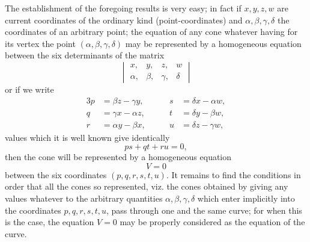 \documentclass[11pt,a4paper]{book}
\begin{document}
The establishment of the foregoing results is very easy; in fact if $x, y, z, w$ are current coordinates of the ordinary kind (point-coordinates) and $\alpha, \beta, \gamma, \delta$ the coordinates of an arbitrary point; the equation of any cone whatever having for its vertex the point $(\alpha, \beta, \gamma, \delta)$ may be represented by a homogeneous equation between the six determinants of the matrix
\[
\begin{vmatrix}
x, & y, & z, & w \\
\alpha, & \beta, & \gamma, & \delta
\end{vmatrix}
\]
or if we write
\begin{alignat*}{3}
p &= \beta z - \gamma y, &\qquad s &= \delta x - \alpha w,\\
q &= \gamma x - \alpha z, &\qquad t &= \delta y - \beta w,\\
r &= \alpha y - \beta x, &\qquad u &= \delta z - \gamma w,
\end{alignat*}
values which it is well known give identically
\[
ps + qt + ru = 0,
\]
then the cone will be represented by a homogeneous equation
\[
V = 0
\]
between the six coordinates $(p, q, r, s, t, u)$. It remains to find the conditions in order that all the cones so represented, viz. the cones obtained by giving any values whatever to the arbitrary quantities $\alpha, \beta, \gamma, \delta$ which enter implicitly into the coordinates $p, q, r, s, t, u$, pass through one and the same curve; for when this is the case, the equation $V = 0$ may be properly considered as the equation of the curve.
\end{document}
